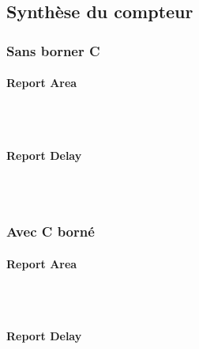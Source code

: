 \documentclass{article}
\newcommand{\subsubsubsection}[1]{\paragraph{#1}\mbox{}\\}
\begin{document}
\newpage
\subsection{Synthèse du compteur}
\subsubsection{Sans borner C}
\subsubsubsection{Report Area}
\begin{verbatim}

\end{verbatim}
\subsubsubsection{Report Delay}
\begin{verbatim}
\end{verbatim}

\subsubsection{Avec C borné}

\subsubsubsection{Report Area}
\begin{verbatim}

\end{verbatim}
\subsubsubsection{Report Delay}
\begin{verbatim}
\end{verbatim}
\end{document}
